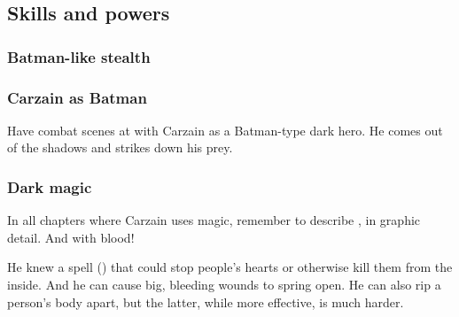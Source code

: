 \subsection{Skills and powers}





\subsubsection{Batman-like stealth}






\subsubsection{Carzain as Batman}
Have combat scenes at \Forclin with Carzain as a Batman-type dark hero. 
He comes out of the shadows and strikes down his prey. 





\subsubsection{Dark magic}
In all chapters where Carzain uses magic, remember to describe , in graphic detail. 
And with blood! 

He knew a spell (\qliphah) that could stop people's hearts or otherwise kill them from the inside. 
And he can cause big, bleeding wounds to spring open. 
He can also rip a person's body apart, but the latter, while more effective, is much harder. 





